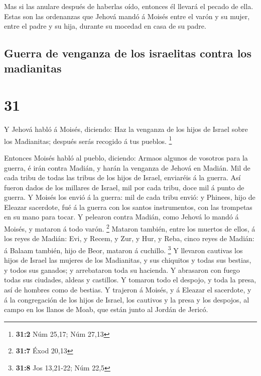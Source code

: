  Mas si las anulare después de haberlas oído, entonces él
llevará el pecado de ella. Estas son las ordenanzas que Jehová mandó á
Moisés entre el varón y su mujer, entre el padre y su hija, durante su
mocedad en casa de su padre.

\hypertarget{guerra-de-venganza-de-los-israelitas-contra-los-madianitas}{%
\subsection{Guerra de venganza de los israelitas contra los
madianitas}\label{guerra-de-venganza-de-los-israelitas-contra-los-madianitas}}

\hypertarget{section-30}{%
\section{31}\label{section-30}}

 Y Jehová habló á Moisés, diciendo:  Haz la
venganza de los hijos de Israel sobre los Madianitas; después serás
recogido á tus pueblos. \footnote{\textbf{31:2} Núm 25,17; Núm 27,13}

 Entonces Moisés habló al pueblo, diciendo: Armaos algunos
de vosotros para la guerra, é irán contra Madián, y harán la venganza de
Jehová en Madián.  Mil de cada tribu de todas las tribus
de los hijos de Israel, enviaréis á la guerra.  Así fueron
dados de los millares de Israel, mil por cada tribu, doce mil á punto de
guerra.  Y Moisés los envió á la guerra: mil de cada tribu
envió: y Phinees, hijo de Eleazar sacerdote, fué á la guerra con los
santos instrumentos, con las trompetas en su mano para tocar.
 Y pelearon contra Madián, como Jehová lo mandó á Moisés,
y mataron á todo varón. \footnote{\textbf{31:7} Éxod 20,13}
 Mataron también, entre los muertos de ellos, á los reyes
de Madián: Evi, y Recem, y Zur, y Hur, y Reba, cinco reyes de Madián: á
Balaam también, hijo de Beor, mataron á cuchillo. \footnote{\textbf{31:8}
  Jos 13,21-22; Núm 22,5}  Y llevaron cautivas los hijos
de Israel las mujeres de los Madianitas, y sus chiquitos y todas sus
bestias, y todos sus ganados; y arrebataron toda su hacienda.
 Y abrasaron con fuego todas sus ciudades, aldeas y
castillos.  Y tomaron todo el despojo, y toda la presa,
así de hombres como de bestias.  Y trajeron á Moisés, y á
Eleazar el sacerdote, y á la congregación de los hijos de Israel, los
cautivos y la presa y los despojos, al campo en los llanos de Moab, que
están junto al Jordán de Jericó.

